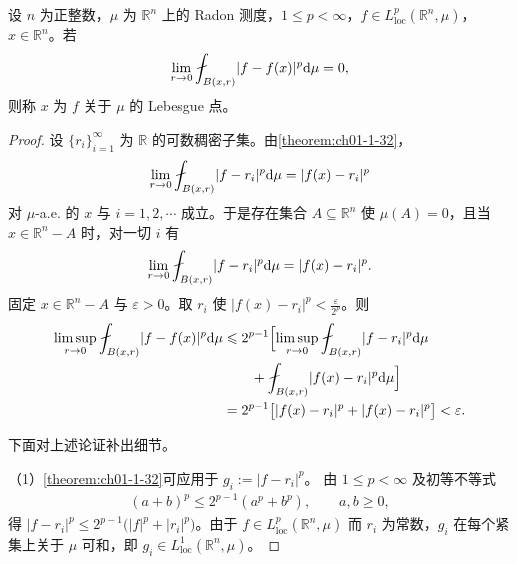 \documentclass[../../main.tex]{subfiles}%
\begin{document}
\begin{definition}[Lebesgue 点]\label{definition:ch01-1-24}
设 $n$ 为正整数，$\mu$ 为 $\mathbb{R}^n$ 上的 Radon 测度，$1\leqslant p<\infty$，$f\in L^{p}_{\mathrm{loc}}(\mathbb{R}^n,\mu)$，$x\in\mathbb{R}^n$。若
\begin{align*}
\lim_{r\to0}\fint_{B(x,r)}\lvert f-f(x)\rvert^{p}\diff\mu=0 ,
\end{align*}
则称 $x$ 为 $f$ 关于 $\mu$ 的 Lebesgue 点。
\end{definition}

\begin{proof}
设 $\{r_i\}_{i=1}^{\infty}$ 为 $\mathbb{R}$ 的可数稠密子集。由\cref{theorem:ch01-1-32}，%
\begin{align*}
\lim_{r\to0}\fint_{B(x,r)}\lvert f-r_i\rvert^{p}\diff\mu=\lvert f(x)-r_i\rvert^{p}
\end{align*}
对 $\mu$-a.e. 的 $x$ 与 $i=1,2,\cdots$ 成立。于是存在集合 $A\subseteq\mathbb{R}^n$ 使 $\mu(A)=0$，且当 $x\in\mathbb{R}^n-A$ 时，对一切 $i$ 有
\begin{align*}
\lim_{r\to0}\fint_{B(x,r)}\lvert f-r_i\rvert^{p}\diff\mu=\lvert f(x)-r_i\rvert^{p} .
\end{align*}
固定 $x\in\mathbb{R}^n-A$ 与 $\varepsilon>0$。取 $r_i$ 使 $\lvert f(x)-r_i\rvert^{p}<\frac{\varepsilon}{2^{p}}$。则
\begin{align*}
\limsup_{r\to0}\fint_{B(x,r)}\lvert f-f(x)\rvert^{p}\diff\mu
&\leqslant 2^{p-1}\Bigl[\limsup_{r\to0}\fint_{B(x,r)}\lvert f-r_i\rvert^{p}\diff\mu\\
&\qquad+\fint_{B(x,r)}\lvert f(x)-r_i\rvert^{p}\diff\mu\Bigr]\\
&=2^{p-1}\bigl[\lvert f(x)-r_i\rvert^{p}+\lvert f(x)-r_i\rvert^{p}\bigr]<\varepsilon .
\end{align*}

下面对上述论证补出细节。

（1）\cref{theorem:ch01-1-32}可应用于 $g_i:=\lvert f-r_i\rvert^{p}$。 由 $1\leqslant p<\infty$ 及初等不等式 %
\begin{align*}
(a+b)^{p}\leqslant2^{p-1}(a^{p}+b^{p}),\qquad a,b\geqslant0 ,
\end{align*}
得 $\lvert f-r_i\rvert^{p}\leqslant2^{p-1}\bigl(\lvert f\rvert^{p}+\lvert r_i\rvert^{p}\bigr)$。由于 $f\in L^{p}_{\mathrm{loc}}(\mathbb{R}^n,\mu)$ 而 $r_i$ 为常数，$g_i$ 在每个紧集上关于 $\mu$ 可和，即 $g_i\in L^{1}_{\mathrm{loc}}(\mathbb{R}^n,\mu)$。


\end{proof}
\end{document}
